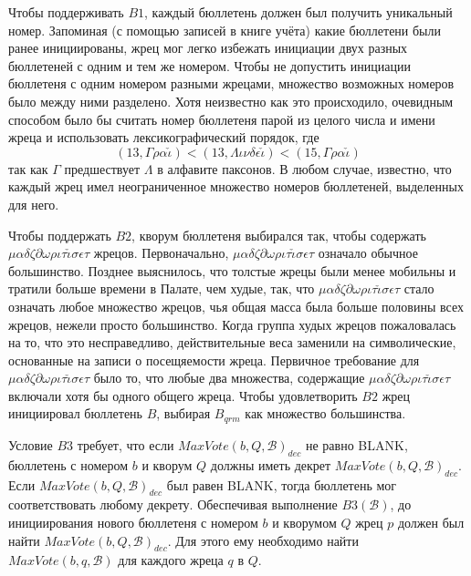 \documentclass[12pt, a4paper]{article} %
\begin{document}
Чтобы поддерживать $B1$, каждый бюллетень должен был получить уникальный номер. Запоминая (с помощью записей в книге учёта) какие бюллетени были ранее инициированы, жрец мог легко избежать инициации двух разных бюллетеней с одним и тем же номером. Чтобы не допустить инициации бюллетеня с одним номером разными жрецами, множество возможных номеров было между ними разделено. Хотя неизвестно как это происходило, очевидным способом было бы считать номер бюллетеня парой из целого числа и имени жреца и использовать лексикографический порядок, где
\[
    (13, \Gamma\rho\alpha\check{\iota}) < (13, \Lambda\iota\nu\delta\epsilon\check{\iota}) < (15, \Gamma\rho\alpha\check{\iota})
\]
так как $\Gamma$ предшествует $\Lambda$ в алфавите паксонов. В любом случае, известно, что каждый жрец имел неограниченное множество номеров бюллетеней, выделенных для него.

Чтобы поддержать $B2$, кворум бюллетеня выбирался так, чтобы содержать $\mu\alpha\delta\zeta\partial\omega\rho\iota\tau\check{\iota}\sigma\epsilon\tau$ жрецов. Первоначально, $\mu\alpha\delta\zeta\partial\omega\rho\iota\tau\check{\iota}\sigma\epsilon\tau$ означало обычное большинство. Позднее выяснилось, что толстые жрецы были менее мобильны и тратили больше времени в Палате, чем худые, так, что $\mu\alpha\delta\zeta\partial\omega\rho\iota\tau\check{\iota}\sigma\epsilon\tau$ стало означать любое множество жрецов, чья общая масса была больше половины всех жрецов, нежели просто большинство. Когда группа худых жрецов пожаловалась на то, что это несправедливо, действительные веса заменили на символические, основанные на записи о посещяемости жреца. Первичное требование для $\mu\alpha\delta\zeta\partial\omega\rho\iota\tau\check{\iota}\sigma\epsilon\tau$ было то, что любые два множества, содержащие $\mu\alpha\delta\zeta\partial\omega\rho\iota\tau\check{\iota}\sigma\epsilon\tau$ включали хотя бы одного общего жреца. Чтобы удовлетворить $B2$ жрец инициировал бюллетень $B$, выбирая $B_{qrm}$ как множество большинства.

Условие $B3$ требует, что если $MaxVote(b, Q, \mathcal{B})_{dec}$ не равно \textsc{BLANK}, бюллетень с номером $b$ и кворум $Q$ должны иметь декрет $MaxVote(b, Q, \mathcal{B})_{dec}$. Если $MaxVote(b, Q, \mathcal{B})_{dec}$ был равен \textsc{BLANK}, тогда бюллетень мог соответствовать любому декрету. Обеспечивая выполнение $B3(\mathcal{B})$, до инициирования нового бюллетеня с номером $b$ и кворумом $Q$ жрец $p$ должен был найти $MaxVote(b, Q, \mathcal{B})_{dec}$. Для этого ему необходимо найти $MaxVote(b, q, \mathcal{B})$ для каждого жреца $q$ в $Q$.
\end{document}

